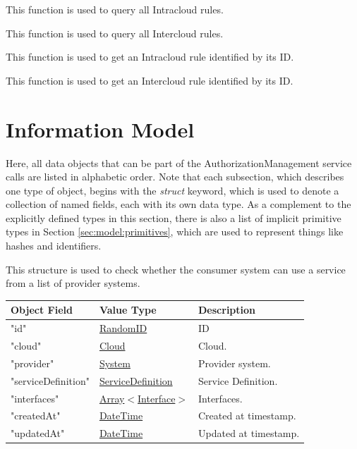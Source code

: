 \documentclass[a4paper]{arrowhead}
\newcommand{\mref}[1]{{\textcolor{ArrowheadPurple}{\hyperref[sec:model:#1]{#1}}}}
\newcommand{\pref}[1]{{\textcolor{ArrowheadGrey}{\hyperref[sec:model:primitives:#1]{#1}}}}
\begin{document}

This function is used to query all Intracloud rules.


This function is used to query all Intercloud rules.


This function is used to get an Intracloud rule identified by its ID.


This function is used to get an Intercloud rule identified by its ID.

\newpage

\section{Information Model}
\label{sec:model}

Here, all data objects that can be part of the AuthorizationManagement service calls are listed in alphabetic order.
Note that each subsection, which describes one type of object, begins with the \textit{struct} keyword, which is used to denote a collection of named fields, each with its own data type.
As a complement to the explicitly defined types in this section, there is also a list of implicit primitive types in Section \ref{sec:model:primitives}, which are used to represent things like hashes and identifiers.


This structure is used to check whether the consumer system can use a service from a list of provider systems.

\begin{table}[ht!]
\begin{tabularx}{\textwidth}{| p{5cm} | p{5cm} | X |} \hline
\rowcolor{gray!33} Object Field & Value Type      & Description \\ \hline
"id"                 & \pref{RandomID}                     & ID \\ \hline
"cloud"              & \pref{Cloud}                        & Cloud. \\ \hline
"provider"           & \pref{System}                     & Provider system. \\ \hline
"serviceDefinition"  & \pref{ServiceDefinition}            & Service Definition. \\ \hline
"interfaces"         & \pref{Array}$<$\mref{Interface}$>$  & Interfaces. \\ \hline
"createdAt"          & \pref{DateTime}                     & Created at timestamp. \\ \hline
"updatedAt"          & \pref{DateTime}                     & Updated at timestamp. \\ \hline

\end{tabularx}
\end{table}
\end{document}
